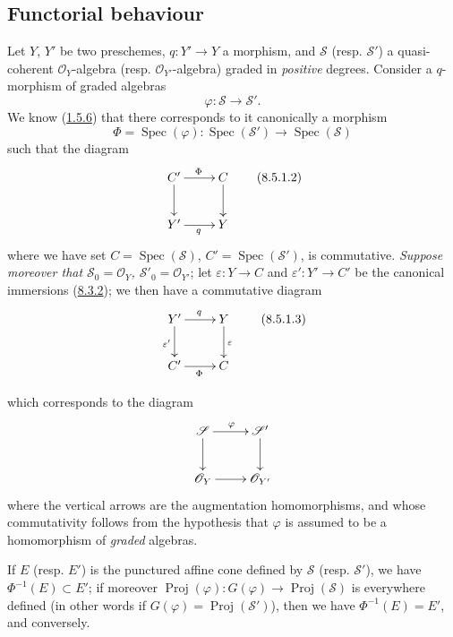 \subsection{Functorial behaviour}
\label{subsection:II.8.5}

\begin{env}[8.5.1]
\label{II.8.5.1}
Let $Y$, $Y'$ be two preschemes, $q:Y'\to Y$ a morphism, and
$\mathcal{S}$ (resp. $\mathcal{S}'$) a quasi-coherent $\mathcal{O}_Y$-algebra
(resp. $\mathcal{O}_{Y'}$-algebra) graded in
\emph{positive} degrees. Consider a $q$-morphism of graded algebras
\begin{equation}
\label{II.8.5.1.1}
  \varphi:\mathcal{S}\to\mathcal{S}'.
\tag{8.5.1.1}
\end{equation}
We know (\hyperref[II.1.5.6]{1.5.6}) that there corresponds to it canonically a
morphism
\[
  \Phi=\operatorname{Spec}(\varphi):
  \operatorname{Spec}(\mathcal{S}')\to\operatorname{Spec}(\mathcal{S})
\]
such that the diagram
\begin{equation}
\label{II.8.5.1.2}
  \xymatrix{
    C'\ar[r]^{\Phi}\ar[d] & C\ar[d]\\
    Y'\ar[r]_{q} & Y
  }
\tag{8.5.1.2}
\end{equation}
where we have set $C=\operatorname{Spec}(\mathcal{S})$,
$C'=\operatorname{Spec}(\mathcal{S}')$, is commutative.
\emph{Suppose moreover that
$\mathcal{S}_0=\mathcal{O}_Y$, $\mathcal{S}'_0=\mathcal{O}_{Y'}$}; let
$\varepsilon:Y\to C$ and $\varepsilon':Y'\to C'$ be the canonical immersions
(\hyperref[II.8.3.2]{8.3.2}); we then have a commutative diagram
\begin{equation}
\label{II.8.5.1.3}
  \xymatrix{
    Y'\ar[r]^{q}\ar[d]_{\varepsilon'} & Y\ar[d]^{\varepsilon}\\
    C'\ar[r]_{\Phi} & C
  }
\tag{8.5.1.3}
\end{equation}

which corresponds to the diagram
\[
  \xymatrix{
    \mathcal{S}\ar[r]^{\varphi}\ar[d] & \mathcal{S}'\ar[d]\\
    \mathcal{O}_Y\ar[r] & \mathcal{O}_{Y'}
  }
\]
where the vertical arrows are the augmentation homomorphisms, and whose
commutativity follows from the hypothesis that $\varphi$ is assumed to be a
homomorphism of \emph{graded} algebras.
\end{env}

\begin{proposition}[8.5.2]
\label{II.8.5.2}
If $E$ (resp. $E'$) is the punctured affine cone defined by $\mathcal{S}$
(resp. $\mathcal{S}'$), we have $\Phi^{-1}(E)\subset E'$; if moreover
$\operatorname{Proj}(\varphi):G(\varphi)\to\operatorname{Proj}(\mathcal{S})$
is everywhere defined (in other words if
$G(\varphi)=\operatorname{Proj}(\mathcal{S}')$), then we have
$\Phi^{-1}(E)=E'$, and conversely.
\end{proposition}

